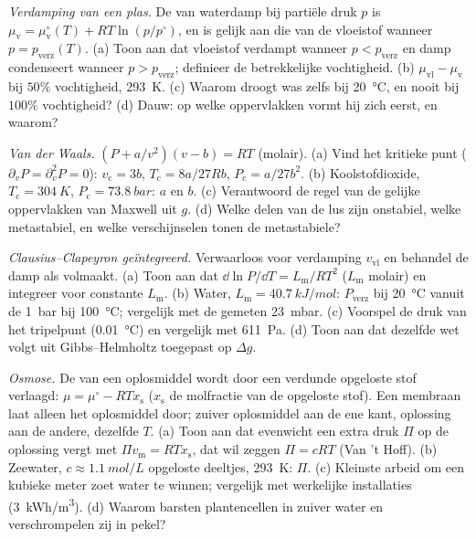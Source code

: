 \begin{exercise}[$\star\star$]\label{exo:b2:thermodynamic-potentials:8}
\emph{Verdamping van een plas.} De  van waterdamp
bij partiële druk $p$ is
$\mu_{\text{v}} = \mu_{\text{v}}^\circ(T) +
RT\ln(p/p^\circ)$, en is gelijk
aan die van de vloeistof wanneer $p = p_{\text{verz}}(T)$.
(a) Toon aan dat vloeistof verdampt wanneer $p < p_{\text{verz}}$ en damp
condenseert wanneer $p > p_{\text{verz}}$; definieer de betrekkelijke
vochtigheid. (b)
$\mu_{\text{vl}} - \mu_{\text{v}}$ bij $50\%$ vochtigheid, \qty{293}{K}. (c) Waarom
droogt was zelfs bij \qty{20}{\celsius}, en nooit bij $100\%$ vochtigheid?
(d) Dauw: op welke oppervlakken vormt hij zich eerst, en waarom?
\end{exercise}

\begin{exercise}[$\star\star$]\label{exo:b2:thermodynamic-potentials:9}
\emph{Van der Waals.} $(P + a/v^2)(v - b) = RT$ (molair). (a) Vind het
kritieke punt ($\partial_vP = \partial_v^2P = 0$): $v_{\text{c}} = 3b$,
$T_{\text{c}} = 8a/27Rb$, $P_{\text{c}} = a/27b^2$. (b) Koolstofdioxide,
$T_{\text{c}} = \qty{304}{K}$, $P_{\text{c}} = \qty{73.8}{bar}$: $a$ en $b$. (c)
Verantwoord de regel van de gelijke oppervlakken van Maxwell uit $g$. (d)
Welke delen van de lus
zijn onstabiel, welke metastabiel, en welke verschijnselen tonen de metastabiele?
\end{exercise}

\begin{exercise}[$\star\star\star$]\label{exo:b2:thermodynamic-potentials:10}
\emph{Clausius--Clapeyron geïntegreerd.} Verwaarloos voor verdamping
$v_{\text{vl}}$
en behandel de damp als volmaakt. (a) Toon aan dat
$\dd\ln P/\dd T = L_{\text{m}}/RT^2$
($L_{\text{m}}$ molair) en integreer voor constante $L_{\text{m}}$. (b) Water,
$L_{\text{m}} = \qty{40.7}{kJ/mol}$: $P_{\text{verz}}$ bij \qty{20}{\celsius}
vanuit de
\qty{1}{bar} bij \qty{100}{\celsius}; vergelijk met de gemeten \qty{23}{mbar}.
(c) Voorspel de druk van het tripelpunt (\qty{0.01}{\celsius}) en vergelijk
met \qty{611}{Pa}. (d) Toon aan dat dezelfde wet volgt uit Gibbs--Helmholtz
toegepast op $\Delta g$.
\end{exercise}

\begin{exercise}[$\star\star\star$]\label{exo:b2:thermodynamic-potentials:11}
\emph{Osmose.} De  van een oplosmiddel wordt door een verdunde
opgeloste stof verlaagd: $\mu = \mu^\circ - RTx_{\text{s}}$ ($x_{\text{s}}$
de molfractie
van de opgeloste stof). Een membraan laat alleen het oplosmiddel door;
zuiver oplosmiddel aan
de ene kant, oplossing aan de andere, dezelfde $T$. (a) Toon aan dat evenwicht
een extra druk $\Pi$ op de oplossing vergt met
$\Pi v_{\text{m}} =
RTx_{\text{s}}$, dat wil zeggen $\Pi = cRT$ (Van 't
Hoff). (b) Zeewater, $c \approx
\qty{1.1}{mol/L}$ opgeloste deeltjes,
\qty{293}{K}: $\Pi$. (c) Kleinste
arbeid om een kubieke meter zoet water te winnen; vergelijk met werkelijke
installaties
(\qty{3}{kWh/m^3}). (d) Waarom barsten plantencellen in zuiver water en
verschrompelen zij in pekel?
\end{exercise}

